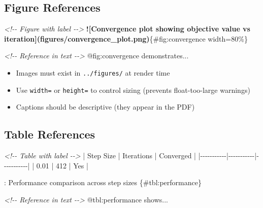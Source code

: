 \documentclass[
]{article}
\newenvironment{Shaded}{}{}
\newcommand{\AlertTok}[1]{\textcolor[rgb]{1.00,0.00,0.00}{\textbf{#1}}}
\newcommand{\CommentTok}[1]{\textcolor[rgb]{0.38,0.63,0.69}{\textit{#1}}}
\newcommand{\NormalTok}[1]{#1}
\newcommand{\PreprocessorTok}[1]{\textcolor[rgb]{0.74,0.48,0.00}{#1}}
\providecommand{\tightlist}{%
  \setlength{\itemsep}{0pt}\setlength{\parskip}{0pt}}
\begin{document}
\subsection{Figure References}\label{figure-references}

\begin{Shaded}
\begin{Highlighting}[]
\CommentTok{\textless{}!{-}{-} Figure with label {-}{-}\textgreater{}}
\AlertTok{![Convergence plot showing objective value vs iteration](figures/convergence\_plot.png)}\NormalTok{\{\#fig:convergence width=80\%\}}

\CommentTok{\textless{}!{-}{-} Reference in text {-}{-}\textgreater{}}
\NormalTok{@fig:convergence demonstrates...}
\end{Highlighting}
\end{Shaded}

\begin{itemize}
\tightlist
\item
  Images must exist in \texttt{../figures/} at render time
\item
  Use \texttt{width=} or \texttt{height=} to control sizing (prevents
  float-too-large warnings)
\item
  Captions should be descriptive (they appear in the PDF)
\end{itemize}

\subsection{Table References}\label{table-references}

\begin{Shaded}
\begin{Highlighting}[]
\CommentTok{\textless{}!{-}{-} Table with label {-}{-}\textgreater{}}
\PreprocessorTok{|}\NormalTok{ Step Size }\PreprocessorTok{|}\NormalTok{ Iterations }\PreprocessorTok{|}\NormalTok{ Converged }\PreprocessorTok{|}
\PreprocessorTok{|{-}{-}{-}{-}{-}{-}{-}{-}{-}{-}{-}|{-}{-}{-}{-}{-}{-}{-}{-}{-}{-}{-}|{-}{-}{-}{-}{-}{-}{-}{-}{-}{-}{-}|}
\PreprocessorTok{|}\NormalTok{ 0.01      }\PreprocessorTok{|}\NormalTok{ 412       }\PreprocessorTok{|}\NormalTok{ Yes       }\PreprocessorTok{|}

\NormalTok{: Performance comparison across step sizes \{\#tbl:performance\}}

\CommentTok{\textless{}!{-}{-} Reference in text {-}{-}\textgreater{}}
\NormalTok{@tbl:performance shows...}
\end{Highlighting}
\end{Shaded}
\end{document}
